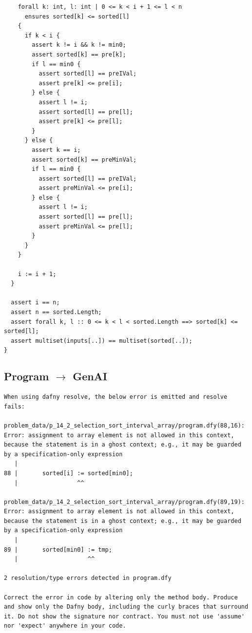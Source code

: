 \documentclass{article}
\begin{document}
\begin{lstlisting}
    forall k: int, l: int | 0 <= k < i + 1 <= l < n
      ensures sorted[k] <= sorted[l]
    {
      if k < i {
        assert k != i && k != min0;
        assert sorted[k] == pre[k];
        if l == min0 {
          assert sorted[l] == preIVal;
          assert pre[k] <= pre[i];
        } else {
          assert l != i;
          assert sorted[l] == pre[l];
          assert pre[k] <= pre[l];
        }
      } else {
        assert k == i;
        assert sorted[k] == preMinVal;
        if l == min0 {
          assert sorted[l] == preIVal;
          assert preMinVal <= pre[i];
        } else {
          assert l != i;
          assert sorted[l] == pre[l];
          assert preMinVal <= pre[l];
        }
      }
    }

    i := i + 1;
  }

  assert i == n;
  assert n == sorted.Length;
  assert forall k, l :: 0 <= k < l < sorted.Length ==> sorted[k] <= sorted[l];
  assert multiset(inputs[..]) == multiset(sorted[..]);
}
\end{lstlisting}
\subsection*{Program $\rightarrow$ GenAI}
\begin{lstlisting}
When using dafny resolve, the below error is emitted and resolve fails:

problem_data/p_14_2_selection_sort_interval_array/program.dfy(88,16): Error: assignment to array element is not allowed in this context, because the statement is in a ghost context; e.g., it may be guarded by a specification-only expression
   |
88 |       sorted[i] := sorted[min0];
   |                 ^^

problem_data/p_14_2_selection_sort_interval_array/program.dfy(89,19): Error: assignment to array element is not allowed in this context, because the statement is in a ghost context; e.g., it may be guarded by a specification-only expression
   |
89 |       sorted[min0] := tmp;
   |                    ^^

2 resolution/type errors detected in program.dfy

Correct the error in code by altering only the method body. Produce and show only the Dafny body, including the curly braces that surround it. Do not show the signature nor contract. You must not use 'assume' nor 'expect' anywhere in your code.
\end{lstlisting}
\end{document}
